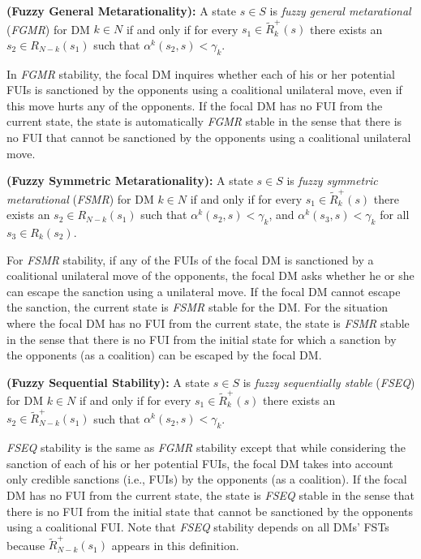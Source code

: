 \begin{definition}\label{def-fgmr-ndm}
\rm {\bf (Fuzzy General Metarationality):} A state $s \in S$ is \emph{fuzzy general metarational} (\emph{FGMR}) for DM $k \in N$ if and only if for every $s_1 \in \widetilde{R}_k^+(s)$ there exists an $s_2 \in R_{N-k}(s_1)$ such that $\alpha^k(s_2, s)<\gamma_k$.
\end{definition}

In \emph{FGMR} stability, the focal DM inquires whether each of his or her potential FUIs is sanctioned by the opponents using a coalitional unilateral move, even if this move hurts any of the opponents. If the focal DM has no FUI from the current state, the state is automatically \emph{FGMR} stable in the sense that there is no FUI that cannot be sanctioned by the opponents using a coalitional unilateral move.

\begin{definition}\label{def-fsmr-ndm}
\rm {\bf (Fuzzy Symmetric Metarationality):} A state $s \in S$ is \emph{fuzzy symmetric metarational} (\emph{FSMR}) for DM $k \in N$ if and only if for every $s_1 \in \widetilde{R}_k^+(s)$ there exists an $s_2 \in R_{N-k}(s_1)$ such that $\alpha^k(s_2, s)<\gamma_k$, and $\alpha^k(s_3, s)<\gamma_k$ for all $s_3 \in R_k(s_2)$.
\end{definition}

\noindent For \emph{FSMR} stability, if any of the FUIs of the focal DM is sanctioned by a coalitional unilateral move of the opponents, the focal DM asks whether he or she can escape the sanction using a unilateral move. If the focal DM cannot escape the sanction, the current state is \emph{FSMR} stable for the DM. For the situation where the focal DM has no FUI from the current state, the state is \emph{FSMR} stable in the sense that there is no FUI from the initial state for which a sanction by the opponents (as a coalition) can be escaped by the focal DM.

\begin{definition}\label{def-fseq-ndm}
\rm {\bf (Fuzzy Sequential Stability):} A state $s \in S$ is \emph{fuzzy sequentially stable} (\emph{FSEQ}) for DM $k \in N$ if and only if for every $s_1 \in \widetilde{R}_k^+(s)$ there exists an $s_2 \in \widetilde{R}_{N-k}^+(s_1)$ such that $\alpha^k(s_2, s) < \gamma_k$.
\end{definition}

\emph{FSEQ} stability is the same as \emph{FGMR} stability except that while considering the sanction of each of his or her potential FUIs, the focal DM takes into account only credible sanctions (i.e., FUIs) by the opponents (as a coalition). If the focal DM has no FUI from the current state, the state is \emph{FSEQ} stable in the sense that there is no FUI from the initial state that cannot be sanctioned by the opponents using a coalitional FUI. Note that \emph{FSEQ} stability depends on all DMs' FSTs  because $\widetilde{R}_{N-k}^+(s_1)$ appears in this definition.

